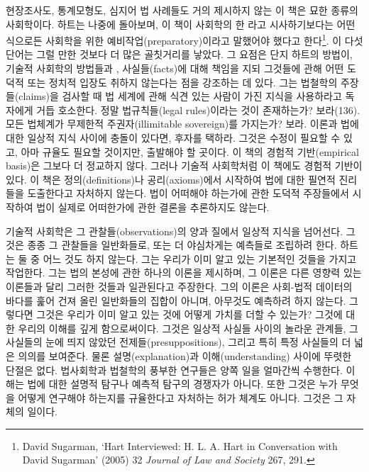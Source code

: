 현장조사도, 통계모형도, 심지어 법 사례들도 거의 제시하지 않는 이 책은
묘한 종류의 사회학이다. 하트는 나중에 돌아보며, 이 책이 사회학의 한
라고 시사하기보다는 어떤 식으로든 사회학을 위한
예비작업(preparatory)이라고 말했어야 했다고 한다\footnote{David
  Sugarman, `Hart Interviewed: H. L. A. Hart in Conversation with David
  Sugarman' (2005) 32 \emph{Journal of Law and Society} 267, 291.}. 이
다섯 단어는 그럴 만한 것보다 더 많은 골칫거리를 낳았다. 그 요점은 단지
하트의 방법이, 기술적 사회학의 방법들과 ,
사실들(facts)에 대해 책임을 지되 그것들에 관해 어떤 도덕적 또는 정치적
입장도 취하지 않는다는 점을 강조하는 데 있다. 그는 법철학의
주장들(claims)을 검사할 때 법 세계에 관해 식견 있는 사람이 가진 지식을
사용하라고 독자에게 거듭 호소한다. 정말 법규칙들(legal rules)이라는 것이
존재하는가? 보라(136). 모든 법체계가 무제한적 주권자(illimitable
sovereign)를 가지는가? 보라.  이론과 법에 대한
일상적 지식 사이에 충돌이 있다면, 후자를 택하라. 그것은 수정이 필요할 수
있고, 아마 규율도 필요할 것이지만, 출발해야 할 곳이다. 이 책의 경험적
기반(empirical basis)은 그보다 더 정교하지 않다. 그러나 기술적
사회학처럼 이 책에도 경험적 기반이 있다. 이 책은 정의(definitions)나
공리(axioms)에서 시작하여 법에 대한 필연적 진리들을 도출한다고 자처하지
않는다. 법이 어떠해야 하는가에 관한 도덕적 주장들에서 시작하여 법이
실제로 어떠한가에 관한 결론을 추론하지도 않는다.

기술적 사회학은 그 관찰들(observations)의 양과 질에서 일상적 지식을
넘어선다. 그것은 종종 그 관찰들을 일반화들로, 또는 더 야심차게는
예측들로 조립하려 한다. 하트는 둘 중 어느 것도 하지 않는다. 그는 우리가
이미 알고 있는 기본적인 것들을 가지고 작업한다. 그는 법의 본성에 관한
하나의 이론을 제시하며, 그 이론은 다른 영향력 있는 이론들과 달리 그러한
것들과 일관된다고 주장한다. 그의 이론은 사회-법적 데이터의 바다를 훑어
건져 올린 일반화들의 집합이 아니며, 아무것도 예측하려 하지 않는다.
그렇다면 그것은 우리가 이미 알고 있는 것에 어떻게 가치를 더할 수 있는가?
그것에 대한 우리의 이해를 깊게 함으로써이다. 그것은 일상적 사실들 사이의
놀라운 관계들, 그 사실들의 눈에 띄지 않았던 전제들(presuppositions),
그리고 특히 특정 사실들의 더 넓은 의의를 보여준다. 물론
설명(explanation)과 이해(understanding) 사이에 뚜렷한 단절은 없다.
법사회학과 법철학의 풍부한 연구들은 양쪽 일을 얼마간씩 수행한다. 이해는
법에 대한 설명적 탐구나 예측적 탐구의 경쟁자가 아니다. 또한 그것은 누가
무엇을 어떻게 연구해야 하는지를 규율한다고 자처하는 허가 체계도 아니다.
그것은 그 자체의 일이다.

